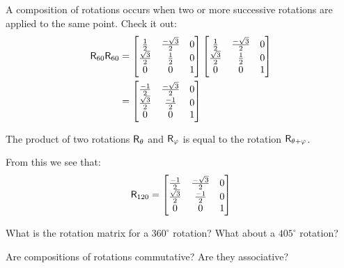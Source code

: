 \documentclass{ximera}
\begin{document}
A composition of rotations occurs when two or more successive
rotations are applied to the same point. Check it out: 
\begin{align*}
\mathsf{R}_{60}\mathsf{R}_{60} &= \begin{bmatrix}
\frac{1}{2} & \frac{-\sqrt{3}}{2} & 0\\
\frac{\sqrt{3}}{2} & \frac{1}{2} & 0\\
0 & 0 & 1
\end{bmatrix}
\begin{bmatrix}
\frac{1}{2} & \frac{-\sqrt{3}}{2} & 0\\
\frac{\sqrt{3}}{2} & \frac{1}{2} & 0\\
0 & 0 & 1
\end{bmatrix}\\
&= \begin{bmatrix}
\frac{-1}{2} & \frac{-\sqrt{3}}{2} & 0\\
\frac{\sqrt{3}}{2} & \frac{-1}{2} & 0\\
0 & 0 & 1
\end{bmatrix}
\end{align*}

\begin{theorem}
The product of two rotations $\mathsf{R}_\theta$ and $\mathsf{R}_\varphi$ is
equal to the rotation $\mathsf{R}_{\theta+\varphi}$.
\end{theorem}

From this we see that:
\[
\mathsf{R}_{120} =
\begin{bmatrix}
\frac{-1}{2} & \frac{-\sqrt{3}}{2} & 0\\
\frac{\sqrt{3}}{2} & \frac{-1}{2} & 0\\
0 & 0 & 1
\end{bmatrix}
\]

\begin{question} What is the rotation matrix for a $360^\circ$ rotation? What about a $405^\circ$ rotation?
\end{question}


\begin{question}
Are compositions of rotations commutative?  Are they
associative?
\end{question}
\end{document}
